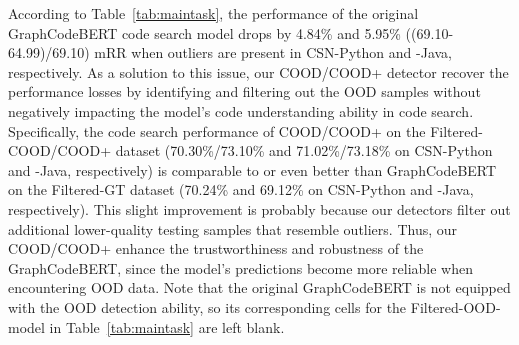 According to Table~\ref{tab:maintask}, the performance of the original GraphCodeBERT code search model drops by 4.84\% and 5.95\% ((69.10-64.99)/69.10) mRR when outliers are present in CSN-Python and -Java, respectively. As a solution to this issue, our COOD/COOD+ detector recover the performance losses by identifying and filtering out the OOD samples without negatively impacting the model's code understanding ability in code search. Specifically, the code search performance of COOD/COOD+ on the Filtered-COOD/COOD+ dataset (70.30\%/73.10\% and 71.02\%/73.18\% on CSN-Python and -Java, respectively) is comparable to or even better than GraphCodeBERT on the Filtered-GT dataset (70.24\% and 69.12\% on CSN-Python and -Java, respectively). This slight improvement is probably because our detectors filter out additional lower-quality testing samples that resemble outliers. Thus, our COOD/COOD+ enhance the trustworthiness and robustness of the GraphCodeBERT, since the model's predictions become more reliable when encountering OOD data. %
Note that the original GraphCodeBERT is not equipped with the OOD detection ability, so its corresponding cells for the Filtered-OOD-model in Table~\ref{tab:maintask} are left blank.


